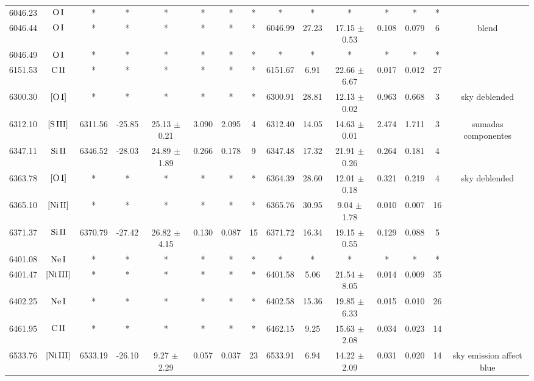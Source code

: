 \documentclass{article}
\begin{document}
\begin{table*}
\begin{adjustbox}{width=\textwidth}
\begin{tabular}{ccccccccccccccc}
6046.23 & $\mbox{O}\thinspace \mbox{I}$ & * & * & * & * & * & * & * & * & * & * & * & * &  \\
6046.44 & $\mbox{O}\thinspace \mbox{I}$ & * & * & * & * & * & * & 6046.99 & 27.23 & 17.15 $\pm$ 0.53 & 0.108 & 0.079 & 6 &  blend \\
6046.49 & $\mbox{O}\thinspace \mbox{I}$ & * & * & * & * & * & * & * & * & * & * & * & * &  \\
6151.53 & $\mbox{C}\thinspace \mbox{II}$ & * & * & * & * & * & * & 6151.67 & 6.91 & 22.66 $\pm$ 6.67 & 0.017 & 0.012 & 27 &  \\
6300.30 & $\mbox{[O}\thinspace \mbox{I]}$ & * & * & * & * & * & * & 6300.91 & 28.81 & 12.13 $\pm$ 0.02 & 0.963 & 0.668 & 3 &  sky deblended \\
6312.10 & $\mbox{[S}\thinspace \mbox{III]}$ & 6311.56 & -25.85 & 25.13 $\pm$ 0.21 & 3.090 & 2.095 & 4 & 6312.40 & 14.05 & 14.63 $\pm$ 0.01 & 2.474 & 1.711 & 3 &  sumadas componentes \\
6347.11 & $\mbox{Si}\thinspace \mbox{II}$ & 6346.52 & -28.03 & 24.89 $\pm$ 1.89 & 0.266 & 0.178 & 9 & 6347.48 & 17.32 & 21.91 $\pm$ 0.26 & 0.264 & 0.181 & 4 &  \\
6363.78 & $\mbox{[O}\thinspace \mbox{I]}$ & * & * & * & * & * & * & 6364.39 & 28.60 & 12.01 $\pm$ 0.18 & 0.321 & 0.219 & 4 &  sky deblended \\
6365.10 & $\mbox{[Ni}\thinspace \mbox{II]}$ & * & * & * & * & * & * & 6365.76 & 30.95 & 9.04 $\pm$ 1.78 & 0.010 & 0.007 & 16 &  \\
6371.37 & $\mbox{Si}\thinspace \mbox{II}$ & 6370.79 & -27.42 & 26.82 $\pm$ 4.15 & 0.130 & 0.087 & 15 & 6371.72 & 16.34 & 19.15 $\pm$ 0.55 & 0.129 & 0.088 & 5 &  \\
6401.08 & $\mbox{Ne}\thinspace \mbox{I}$ & * & * & * & * & * & * & * & * & * & * & * & * &  \\
6401.47 & $\mbox{[Ni}\thinspace \mbox{III]}$ & * & * & * & * & * & * & 6401.58 & 5.06 & 21.54 $\pm$ 8.05 & 0.014 & 0.009 & 35 &  \\
6402.25 & $\mbox{Ne}\thinspace \mbox{I}$ & * & * & * & * & * & * & 6402.58 & 15.36 & 19.85 $\pm$ 6.33 & 0.015 & 0.010 & 26 &  \\
6461.95 & $\mbox{C}\thinspace \mbox{II}$ & * & * & * & * & * & * & 6462.15 & 9.25 & 15.63 $\pm$ 2.08 & 0.034 & 0.023 & 14 &  \\
6533.76 & $\mbox{[Ni}\thinspace \mbox{III]}$ & 6533.19 & -26.10 & 9.27 $\pm$ 2.29 & 0.057 & 0.037 & 23 & 6533.91 & 6.94 & 14.22 $\pm$ 2.09 & 0.031 & 0.020 & 14 &  sky emission affect blue \\

\end{tabular}
\end{adjustbox}
\end{table*}
\end{document}
